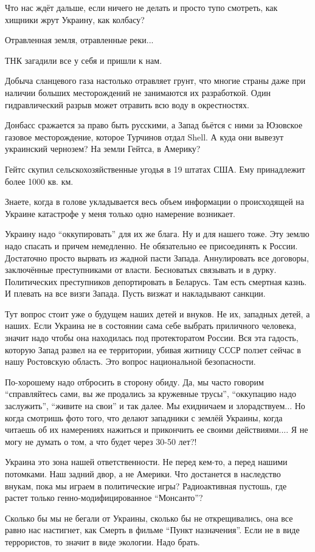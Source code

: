 Что нас ждёт дальше, если ничего не делать и просто тупо смотреть, как хищники
жрут Украину, как колбасу?


Отравленная земля, отравленные реки...

ТНК загадили все у себя и пришли к нам.

Добыча сланцевого газа настолько отравляет грунт, что многие страны даже при
наличии больших месторождений не занимаются их разработкой. Один гидравлический
разрыв может отравить всю воду в окрестностях.

Донбасс сражается за право быть русскими, а Запад бьётся с ними за Юзовское
газовое месторождение, которое Турчинов отдал Shell. А куда они вывезут
украинский чернозем? На земли Гейтса, в Америку?

\begin{zznagolos}
Гейтс скупил сельскохозяйственные угодья в 19 штатах США. Ему принадлежит более 1000 кв. км.	
\end{zznagolos}

Знаете, когда в голове укладывается весь объем информации о происходящей на
Украине катастрофе у меня только одно намерение возникает.

Украину надо \enquote{оккупировать} для их же блага. Ну и для нашего тоже. Эту землю
надо спасать и причем немедленно. Не обязательно ее присоединять к России.
Достаточно просто вырвать из жадной пасти Запада. Аннулировать все договоры,
заключённые преступниками от власти. Бесноватых связывать и в дурку.
Политических преступников депортировать в Беларусь. Там есть смертная казнь. И
плевать на все визги Запада. Пусть визжат и накладывают санкции.

Тут вопрос стоит уже о будущем наших детей и внуков. Не их, западных детей, а
наших. Если Украина не в состоянии сама себе выбрать приличного человека,
значит надо чтобы она находилась под протекторатом России. Вся эта гадость,
которую Запад развел на ее территории, убивая житницу СССР ползет сейчас в нашу
Ростовскую область. Это вопрос национальной безопасности.

По-хорошему надо отбросить в сторону обиду. Да, мы часто говорим \enquote{справляйтесь
сами, вы же продались за кружевные трусы}, \enquote{оккупацию надо заслужить},
\enquote{живите на свои} и так далее. Мы ехидничаем и злорадствуем... Но когда смотришь
фото того, что делают западники с землёй Украины, когда читаешь об их
намерениях нажиться и прикончить ее своими действиями.... Я не могу не думать о
том, а что будет через 30-50 лет?!

Украина это зона нашей ответственности. Не перед кем-то, а перед нашими
потомками. Наш задний двор, а не Америки. Что достанется в наследство внукам,
пока мы играем в политические игры? Радиоактивная пустошь, где растет только
генно-модифицированное \enquote{Монсанто}?

Сколько бы мы не бегали от Украины, сколько бы не открещивались, она все равно
нас настигнет, как Смерть в фильме \enquote{Пункт назначения}. Если не в виде
террористов, то значит в виде экологии. Надо брать.

